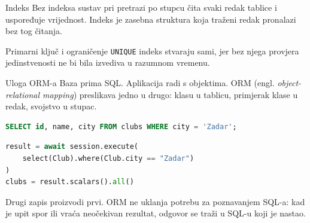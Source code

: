 \begin{frame}{Indeks}
Bez indeksa sustav pri pretrazi po stupcu čita svaki redak tablice i uspoređuje vrijednost. Indeks je zasebna struktura koja traženi redak pronalazi bez tog čitanja.

\vspace{0.6em}
\begin{center}
\end{center}

\vspace{0.3em}
Primarni ključ i ograničenje \texttt{UNIQUE} indeks stvaraju sami, jer bez njega provjera jedinstvenosti ne bi bila izvediva u razumnom vremenu.
\end{frame}

\begin{frame}[fragile]{Uloga ORM-a}
Baza prima SQL. Aplikacija radi s objektima. ORM (engl. \emph{object-relational mapping}) preslikava jedno u drugo: klasu u tablicu, primjerak klase u redak, svojstvo u stupac.

\begin{lstlisting}[language=sql]
SELECT id, name, city FROM clubs WHERE city = 'Zadar';
\end{lstlisting}

\begin{lstlisting}[language=python]
result = await session.execute(
    select(Club).where(Club.city == "Zadar")
)
clubs = result.scalars().all()
\end{lstlisting}

\vspace{0.3em}
Drugi zapis proizvodi prvi. ORM ne uklanja potrebu za poznavanjem SQL-a: kad je upit spor ili vraća neočekivan rezultat, odgovor se traži u SQL-u koji je nastao.
\end{frame}


